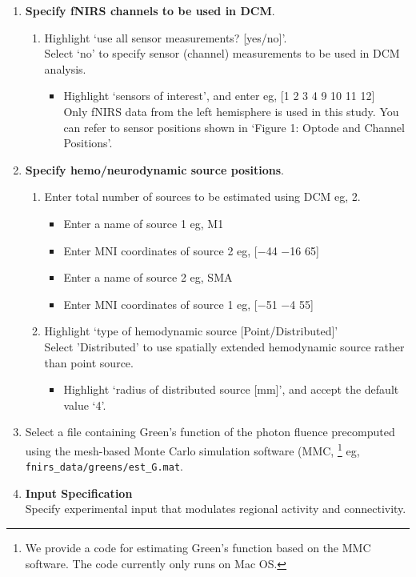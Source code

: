 \begin{enumerate}
\item \textbf{Specify fNIRS channels to be used in DCM}.
\begin{enumerate}
\item Highlight `use all sensor measurements? [yes/no]'.\\Select `no' to specify sensor (channel) measurements to be used in DCM analysis. 
\begin{itemize}
\item Highlight `sensors of interest', and enter eg, [1 2 3 4 9 10 11 12] \\Only fNIRS data from the left hemisphere is used in this study. You can refer to sensor positions shown in `Figure 1: Optode and Channel Positions'.
\end{itemize}
\end{enumerate}
\item \textbf{Specify hemo/neurodynamic source positions}.
\begin{enumerate}
\item Enter total number of sources to be estimated using DCM eg, 2. 
\begin{itemize}
\item Enter a name of source 1 eg, M1
\item Enter MNI coordinates of source 2 eg, [$-$44 $-$16 65]
\item Enter a name of source 2 eg, SMA
\item Enter MNI coordinates of source 1 eg, [$-$51 $-$4 55]
\end{itemize}
\item Highlight `type of hemodynamic source [Point/Distributed]' \\Select 'Distributed' to use spatially extended hemodynamic source rather than point source. 
\begin{itemize}
\item Highlight `radius of distributed source [mm]', and accept the default value `4'. 
\end{itemize}
\end{enumerate}
\item Select a file containing Green's function of the photon fluence precomputed using the mesh-based Monte Carlo simulation software (MMC, \cite{fang2010mesh}\footnote{We provide a code for estimating Green's function based on the MMC software. The code currently only runs on Mac OS.} eg, \texttt{fnirs\_data/greens/est\_G.mat}.
\item \textbf{Input Specification}
\\Specify experimental input that modulates regional activity and connectivity. 

\end{enumerate}
